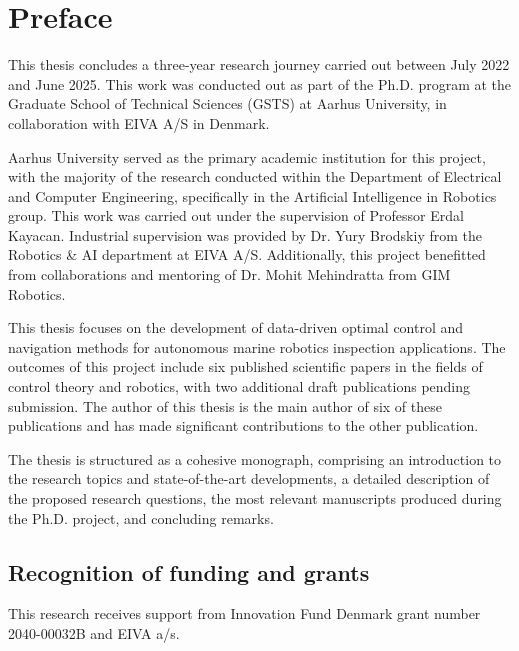 

\chapter*{Preface}
This thesis concludes a three-year research journey carried out between July 2022 and June 2025. This work was conducted out as part of the Ph.D. program at the Graduate School of Technical Sciences (GSTS) at Aarhus University, in collaboration with EIVA A/S in Denmark. 

Aarhus University served as the primary academic institution for this project, with the majority of the research conducted within the Department of Electrical and Computer Engineering, specifically in the Artificial Intelligence in Robotics group. This work was carried out under the supervision of Professor Erdal Kayacan. Industrial supervision was provided by Dr. Yury Brodskiy from the Robotics \& AI department at EIVA A/S. Additionally, this project benefitted from collaborations and mentoring of Dr. Mohit Mehindratta from GIM Robotics. %

This thesis focuses on the development of data-driven optimal control and navigation methods for autonomous marine robotics inspection applications. The outcomes of this project include six published scientific papers in the fields of control theory and robotics, with two additional draft publications pending submission. The author of this thesis is the main author of six of these publications and has made significant contributions to the other publication.


The thesis is structured as a cohesive monograph, comprising an introduction to the research topics and state-of-the-art developments, a detailed description of the proposed research questions, the most relevant manuscripts produced during the Ph.D. project, and concluding remarks.

\section*{Recognition of funding and grants}
This research receives support from Innovation Fund Denmark grant number 2040-00032B and EIVA a/s.


